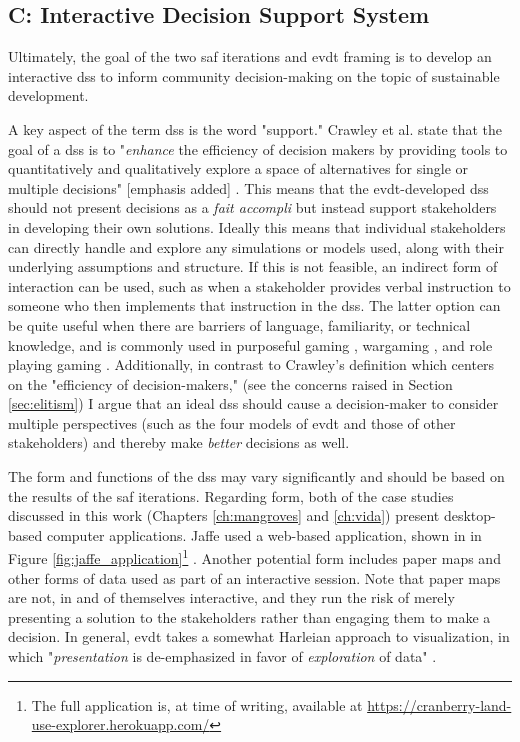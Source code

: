 \subsection{C: Interactive Decision Support System} \label{sec:dss}

Ultimately, the goal of the two \ac{saf} iterations and \ac{evdt} framing is to develop an interactive \acf{dss} to inform community decision-making on the topic of sustainable development.

A key aspect of the term \ac{dss} is the word "support." Crawley et al. state that the goal of a \ac{dss} is to "\emph{enhance} the efficiency of decision makers by providing tools to quantitatively and qualitatively explore a space of alternatives for single or multiple decisions" [emphasis added] \cite{crawleySystemArchitectureStrategy2015}. This means that the \ac{evdt}-developed \ac{dss} should not present decisions as a \textit{fait accompli} but instead support stakeholders in developing their own solutions. Ideally this means that individual stakeholders can directly handle and explore any simulations or models used, along with their underlying assumptions and structure. If this is not feasible, an indirect form of interaction can be used, such as when a stakeholder provides verbal instruction to someone who then implements that instruction in the \ac{dss}. The latter option can be quite useful when there are barriers of language, familiarity, or technical knowledge, and is commonly used in purposeful gaming \cite{rossGamebasedLearningSystems2014}, wargaming \cite{hansonImprovingOperationalWargaming2016,selvaRevitalizingWargamingNecessary15,shlapakReinforcingDeterrenceNATO2016}, and role playing gaming \cite{groganStrategicEngineeringGaming2012,groganFederatedSimulationGaming2012}. Additionally, in contrast to Crawley's definition which centers on the "efficiency of decision-makers," (see the concerns raised in Section \ref{sec:elitism}) I argue that an ideal \ac{dss} should cause a decision-maker to consider multiple perspectives (such as the four models of \ac{evdt} and those of other stakeholders) and thereby make \textit{better} decisions as well.

The form and functions of the \ac{dss} may vary significantly and should be based on the results of the \ac{saf} iterations. Regarding form, both of the case studies discussed in this work (Chapters \ref{ch:mangroves} and \ref{ch:vida}) present desktop-based computer applications. Jaffe used a web-based application, shown in in Figure \ref{fig:jaffe_application}\footnote{The full application is, at time of writing, available at \url{https://cranberry-land-use-explorer.herokuapp.com/}} \cite{jaffeEnvironmentalEconomicSystems2022}. Another potential form includes paper maps and other forms of data used as part of an interactive session. Note that paper maps are not, in and of themselves interactive, and they run the risk of merely presenting a solution to the stakeholders rather than engaging them to make a decision. In general, \ac{evdt} takes a somewhat Harleian approach to visualization, in which "\textit{presentation} is de-emphasized in favor of \textit{exploration} of data" \cite{cramptonMapsSocialConstructions2001}.


